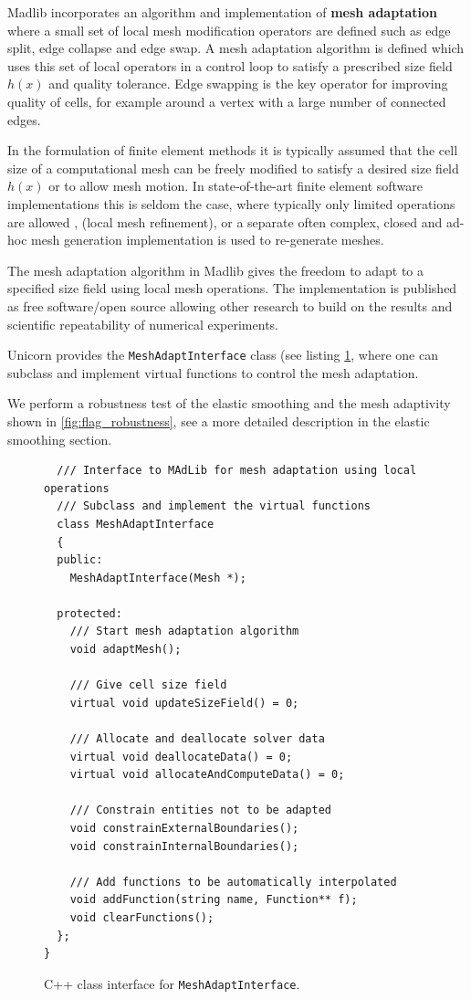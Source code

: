 Madlib incorporates an algorithm and implementation of {\bf mesh
adaptation} where a small set of local mesh modification operators are
defined such as edge split, edge collapse and edge swap. A mesh
adaptation algorithm is defined which uses this set of local operators
in a control loop to satisfy a prescribed size field $h(x)$ and
quality tolerance. Edge swapping is the key operator for improving
quality of cells, for example around a vertex with a large number of
connected edges.

In the formulation of finite element methods it is typically assumed
that the cell size of a computational mesh can be freely modified to
satisfy a desired size field $h(x)$ or to allow mesh motion. In
state-of-the-art finite element software implementations this is
seldom the case, where typically only limited operations are allowed
\cite{BangerthHartmannEtAl2007, COMSOL2009}, (local mesh refinement),
or a separate often complex, closed and ad-hoc mesh generation
implementation is used to re-generate meshes.

The mesh adaptation algorithm in Madlib gives the freedom to adapt to
a specified size field using local mesh operations. The implementation
is published as free software/open source allowing other research to
build on the results and scientific repeatability of numerical
experiments.

Unicorn provides the {\tt MeshAdaptInterface} class (see
listing \ref{code:MeshAdaptInterface}, where one can subclass and
implement virtual functions to control the mesh adaptation.

We perform a robustness test of the elastic smoothing and the mesh
adaptivity shown in \ref{fig:flag_robustness}, see a more detailed
description in the elastic smoothing section.


\begin{figure}[!h]
\begin{lstlisting}
  /// Interface to MAdLib for mesh adaptation using local operations
  /// Subclass and implement the virtual functions
  class MeshAdaptInterface
  {
  public:
    MeshAdaptInterface(Mesh *);

  protected:
    /// Start mesh adaptation algorithm
    void adaptMesh();

    /// Give cell size field
    virtual void updateSizeField() = 0;

    /// Allocate and deallocate solver data
    virtual void deallocateData() = 0;
    virtual void allocateAndComputeData() = 0;

    /// Constrain entities not to be adapted
    void constrainExternalBoundaries();
    void constrainInternalBoundaries();

    /// Add functions to be automatically interpolated
    void addFunction(string name, Function** f);
    void clearFunctions();
  };
}
\end{lstlisting}
\caption{
C++ class interface for {\tt MeshAdaptInterface}.
}
\label{code:MeshAdaptInterface}
\end{figure}



